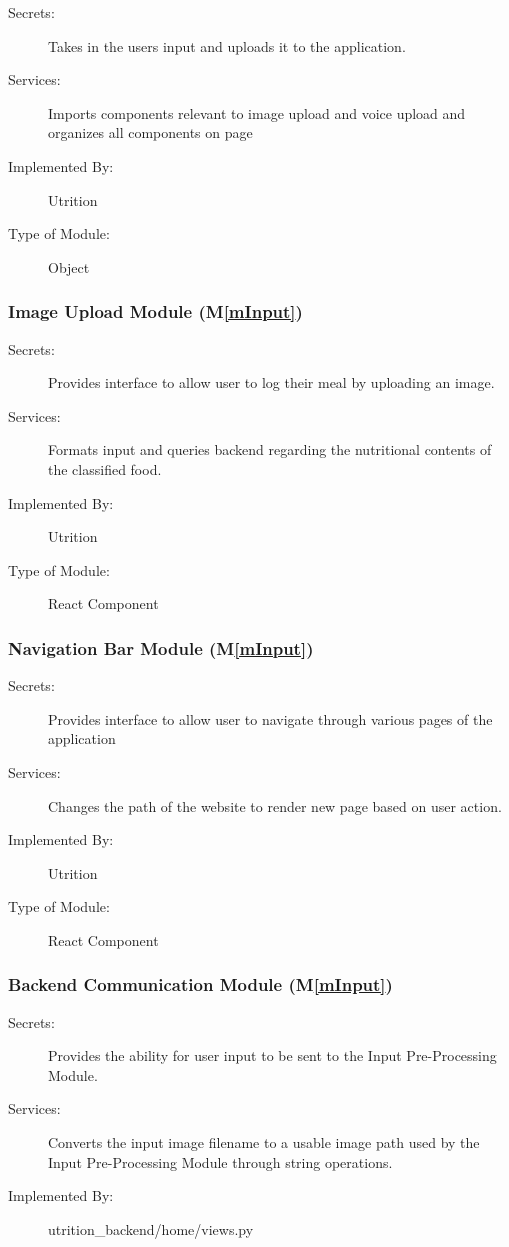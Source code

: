 \documentclass[12pt, titlepage]{article}
\newcommand{\mref}[1]{M\ref{#1}}
\begin{document}
\begin{description}
\item[Secrets:]Takes in the users input and uploads it to the application.
\item[Services:] Imports components relevant to image upload and voice upload and organizes all components on page 
\item[Implemented By:] Utrition
\item[Type of Module:] Object
\end{description}

\subsubsection{Image Upload Module (\mref{mInput})}

\begin{description}
	\item[Secrets:]Provides interface to allow user to log their meal by 
	uploading an image.
	\item[Services:]Formats input and queries backend regarding the nutritional 
	contents of the classified food.
	\item[Implemented By:] Utrition
	\item[Type of Module:] React Component
\end{description}
\subsubsection{Navigation Bar Module (\mref{mInput})}

\begin{description}
	\item[Secrets:]Provides interface to allow user to navigate through various 
	pages of the application
	\item[Services:]Changes the path of the website to render new page based on 
	user action.
	\item[Implemented By:] Utrition
	\item[Type of Module:] React Component
\end{description}

\subsubsection{Backend Communication Module (\mref{mInput})}

\begin{description}
	\item[Secrets:] Provides the ability for user input to be sent to the Input 
	Pre-Processing Module.
	\item[Services:]Converts the input image filename to a usable image path 
	used by the Input Pre-Processing Module through string operations.
	\item[Implemented By:] utrition\_backend/home/views.py
\end{description}
\end{document}
